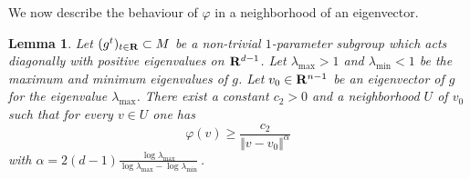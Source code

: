 \documentclass[11pt]{article}
\newtheorem{lemm}[theo]{Lemma}
\theoremstyle{definition}
\numberwithin{equation}{section}
\numberwithin{figure}{section}
\numberwithin{table}{section}
\DeclareMathOperator{\maxrm}{max}
\DeclareMathOperator{\minrm}{min}
\begin{document}
We now describe the behaviour of $\varphi$ in a neighborhood of an eigenvector.

\begin{lemm}\label{H^1_lem2}
Let $(g^t)_{t\in {\bf R}} \subset M$ be a non-trivial $1$-parameter subgroup which acts diagonally with positive eigenvalues on ${\bf R} ^{d-1}$. Let $\lambda _{\maxrm} >1$ and $\lambda _{\minrm}<1$ be the maximum and minimum eigenvalues of $g$. Let $v_0 \in {\bf R} ^{n-1}$ be an eigenvector of $g$ for the eigenvalue $\lambda _{\maxrm}$. There exist a constant $c_2 > 0$ and a neighborhood $U$ of $v_0$ such that for every $v \in U$ one has
\[
\varphi (v) \geqslant \frac{c_2}{\Vert v-v_0 \Vert ^\alpha}
\]
with $\alpha = 2(d-1) \frac{\log \lambda _{\maxrm}}{\log \lambda _{\maxrm}- \log \lambda _{\minrm}}\,$.
\end{lemm}
\end{document}
